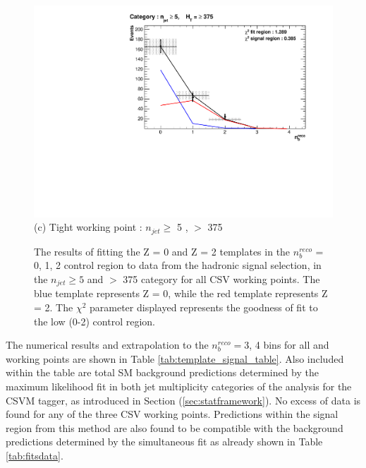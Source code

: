 \begin{figure}[ht]
\begin{minipage}[b]{0.51\linewidth}
\centering
\includegraphics[width = 1.0\linewidth]{plots/TemplatesSignal/Final_Fit_To_Data_Normal_Tight_HTBin_Template_375_jet_mult_5.pdf}
\centering (c) Tight working point :  $n_{jet} \geq$ 5 , \theht $>$ 375 
\end{minipage}
\caption[The results of fitting the Z = 0 and Z = 2 templates in the $n_{b}^{reco}$ = 0, 1, 2 control region to data from the hadronic signal selection, in the $n_{jet} \geq 5$ and \theht $>$ 375 category for all \ac{CSV} working points.]{The results of fitting the Z = 0 and Z = 2 templates in the $n_{b}^{reco}$ = 0, 1, 2 control region to data from the hadronic signal selection, in the $n_{jet} \geq 5$ and \theht $>$ 375 category for all \ac{CSV} working points. The blue template represents Z = 0, while the red template represents Z = 2. The $\chi^{2}$ parameter displayed represents the goodness of fit to the low \nbreco (0-2) control region.}
\label{fig:template_data_signal_njet5}
\end{figure}
\FloatBarrier
The numerical results and extrapolation to the $n_{b}^{reco} =$3, 4 bins for all \theht and working points are shown in Table \ref{tab:template_signal_table}. Also included within the table are total \ac{SM} background predictions determined by the maximum likelihood fit in both jet multiplicity categories of the \alphat analysis for the \ac{CSVM} tagger, as introduced in Section (\ref{sec:statframework}). No excess of data is found for any of the three \ac{CSV} working points. Predictions within the signal region from this method are also found to be compatible with the background predictions determined by the \alphat simultaneous fit as already shown in Table \ref{tab:fitsdata}.


